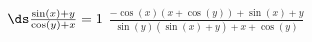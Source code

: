 {$\ds\frac{\sin (x)+y}{\cos (y)+x}=1$
}
{$\frac{-\cos (x) (x+\cos (y))+\sin (x)+y}{\sin (y) (\sin (x)+y)+x+\cos (y)}$
}
